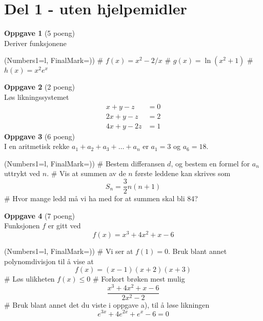 \section*{Del 1 - uten hjelpemidler}
\vspace*{2em}
{\bfseries \large Oppgave 1} (5 poeng) \vspace*{1em} \\
Deriver funksjonene
\begin{easylist}[enumerate]
	\ListProperties(Numbers1=l, FinalMark={)})
	# $f(x) = x^2 - 2/x$
	# $g(x) = \ln \left(x^2 + 1\right)$
	# $h(x) = x^2 e^x$
\end{easylist}
\vfill
\vspace*{2em}
{\bfseries \large Oppgave 2} (2 poeng) \vspace*{1em} \\
Løs likningssystemet
\begin{align*}
x + y -z &= 0 \\
2x + y -z &= 2 \\
4x + y -2z &= 1 
\end{align*}
\vfill
\vspace*{2em}
{\bfseries \large Oppgave 3} (6 poeng) \vspace*{1em} \\
I en aritmetisk rekke $a_1 + a_2 + a_3 + \dots + a_n$ 
er $a_1 = 3$ og $a_6 = 18$.
\begin{easylist}[enumerate]
	\ListProperties(Numbers1=l, FinalMark={)})
	# Bestem differansen $d$, og bestem en formel for $a_n$
	uttrykt ved $n$.
	# Vis at summen av de $n$ første leddene kan skrives som
	$$S_n = \frac{3}{2}n (n+1)$$
	# Hvor mange ledd må vi ha med for at summen skal bli 84?
\end{easylist}
\vfill
\clearpage
{\bfseries \large Oppgave 4} (7 poeng) \vspace*{1em} \\
Funksjonen $f$ er gitt ved
$$f(x) = x^3 + 4x^2 + x - 6$$
\begin{easylist}[enumerate]
	\ListProperties(Numbers1=l, FinalMark={)})
	# Vi ser at $f(1) = 0$.
	Bruk blant annet polynomdivisjon til å vise at
	$$f(x) = (x-1)(x+2)(x+3)$$
	# Løs ulikheten $f(x) \leq 0$
	# Forkort brøken mest mulig
	$$
	\frac{x^3 + 4x^2 + x - 6}{2x^2 - 2}
	$$
	# Bruk blant annet det du viste i oppgave a), til å løse likningen
	\begin{equation*}
		e^{3x} + 4e^{2x} + e^x - 6 = 0
	\end{equation*}
\end{easylist}

